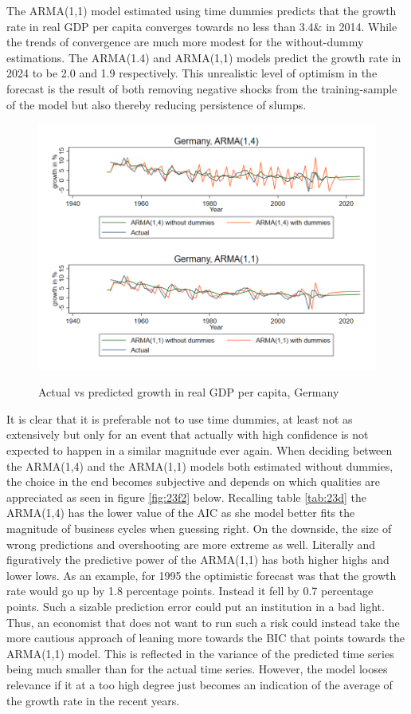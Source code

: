 The ARMA(1,1) model estimated using time dummies predicts that the growth rate in real GDP per capita converges towards no less than 3.4\& in 2014. While the trends of convergence are much more modest for the without-dummy estimations. The ARMA(1.4) and ARMA(1,1) models predict the growth rate in 2024 to be 2.0 and 1.9 respectively. This unrealistic level of optimism in the forecast is the result of both removing negative shocks from the training-sample of the model but also thereby reducing persistence of slumps.
\begin{figure}[H]
  \caption{Actual vs predicted growth in real GDP per capita, Germany}
  \includegraphics[width= \textwidth]{03_figures/fig23f1}
  \label{fig:23f1}
  \vspace{-1cm}
\end{figure}
It is clear that it is preferable not to use time dummies, at least not as extensively but only for an event that actually with high confidence is not expected to happen in a similar magnitude ever again. When deciding between the ARMA(1,4) and the ARMA(1,1) models both estimated without dummies, the choice in the end becomes subjective and depends on which qualities are appreciated as seen in figure \ref{fig:23f2} below. Recalling table \ref{tab:23d} the ARMA(1,4) has the lower value of the AIC as she model better fits the magnitude of business cycles when guessing right. On the downside, the size of wrong predictions and overshooting are more extreme as well. Literally and figuratively the predictive power of the ARMA(1,1) has both higher highs and lower lows. As an example, for 1995 the optimistic forecast was that the growth rate would go up by 1.8 percentage points. Instead it fell by 0.7 percentage points. Such a sizable prediction error could put an institution in a bad light. Thus, an economist that does not want to run such a risk could instead take the more cautious approach of leaning more towards the BIC that points towards the ARMA(1,1) model. This is reflected in the variance of the predicted time series being much smaller than for the actual time series. However, the model looses relevance if it at a too high degree just becomes an indication of the average of the growth rate in the recent years.
